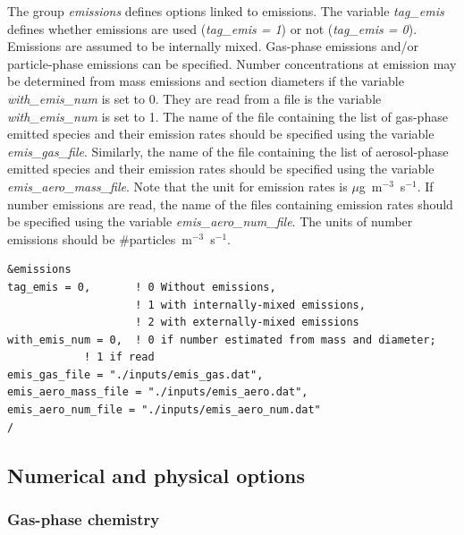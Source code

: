 \documentclass[a4paper,11pt]{article}
\begin{document}
The group {\textit{emissions}} defines options linked to emissions. The variable {\textit{tag\_emis}} defines whether emissions are used ({\textit{tag\_emis = 1}}) or not ({\textit{tag\_emis = 0}}).
Emissions are assumed to be internally mixed. Gas-phase emissions and/or particle-phase emissions can be specified. Number concentrations at emission may be determined from mass emissions and section diameters if the variable {\textit{with\_emis\_num}} is set to 0. They are read from a file is the variable {\textit{with\_emis\_num}} is set to 1. 
The name of the file containing the list of gas-phase emitted species and their emission rates should be specified using the variable {\textit{emis\_gas\_file}}. Similarly, the name of the file containing the list of aerosol-phase emitted species and their emission rates should be specified using the variable {\textit{emis\_aero\_mass\_file}}. Note that the unit for emission rates is $\mu$g~m$^{-3}$~s$^{-1}$. If number emissions are read, the name of the files containing emission rates should be specified using the variable {\textit{emis\_aero\_num\_file}}. The units of number emissions should be \#particles~m$^{-3}$~s$^{-1}$.

\begin{verbatim}
&emissions
tag_emis = 0,       ! 0 Without emissions, 
                    ! 1 with internally-mixed emissions, 
                    ! 2 with externally-mixed emissions  
with_emis_num = 0,  ! 0 if number estimated from mass and diameter; 
		    ! 1 if read
emis_gas_file = "./inputs/emis_gas.dat",
emis_aero_mass_file = "./inputs/emis_aero.dat", 
emis_aero_num_file = "./inputs/emis_aero_num.dat" 
/
\end{verbatim}


\subsection{Numerical and physical options}

\subsubsection{Gas-phase chemistry}
\end{document}
